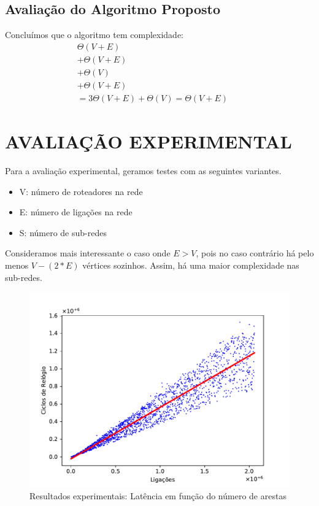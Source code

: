 \documentclass[a4paper, 12pt, conference, portuguese]{ieeeconf}
\begin{document}
\subsection{Avaliação do Algoritmo Proposto}
Concluímos que o algoritmo tem complexidade:
\begin{align*}
  \Theta(V + E) && \tag{Construção do Grafo}\\
  + \Theta(V + E) && \tag{Aplicação 1ª DFS}\\
  + \Theta(V) && \tag{Rem. P. de Articulação}\\
  + \Theta(V + E) && \tag{Aplicação 2ª DFS}\\
  = 3\Theta(V + E) + \Theta(V)
  = \Theta(V + E)
\end{align*}

\section{AVALIAÇÃO EXPERIMENTAL}\label{experimental}
Para a avaliação experimental, geramos testes com as seguintes variantes.
\begin{itemize}
  \item V: número de roteadores na rede
  \item E: número de ligações na rede
  \item S: número de sub-redes
\end{itemize}

Consideramos mais interessante o caso onde $E > V$, pois no caso contrário há
pelo menos $V - (2 * E)$ vértices sozinhos. Assim, há uma maior complexidade nas
sub-redes.

\begin{figure}[t]
  \centering
  \includegraphics[width=1.0\linewidth]{analysis}
  \caption{Resultados experimentais: Latência em função do número de arestas}
  \label{res}
\end{figure}
\end{document}
